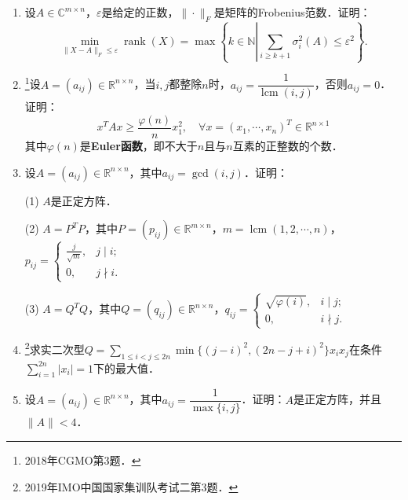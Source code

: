 \documentclass[a4paper,fontset=windows]{ctexbook}
\theoremstyle{definition}
\DeclareMathOperator{\diag}{diag}
\DeclareMathOperator{\lcm}{lcm}
\DeclareMathOperator{\rank}{rank}
\renewcommand{\le}{\leqslant}
\renewcommand{\ge}{\geqslant}
\begin{document}
\begin{enumerate}
\item 设$A\in\mathbb{C}^{m\times n}$，$\varepsilon$是给定的正数，$\|\cdot\|_F$是矩阵的Frobenius范数．证明：
$$\min_{\|X-A\|_F\le\varepsilon}\rank(X)=\max\left\{k\in\mathbb{N}\left|\sum_{i\ge k+1}\sigma_i^2(A)\le\varepsilon^2\right.\right\}.$$

\item \footnote{2018年CGMO第3题．}设$A=(a_{ij})\in\mathbb{R}^{n\times n}$，当$i,j$都整除$n$时，$a_{ij}=\dfrac{1}{\lcm(i,j)}$，否则$a_{ij}=0$．证明：
$$x^TAx\ge\frac{\varphi(n)}{n}x_1^2,\quad\forall x=(x_1,\cdots,x_n)^T\in\mathbb{R}^{n\times 1}$$
其中$\varphi(n)$是{\bf Euler函数}，即不大于$n$且与$n$互素的正整数的个数．

\item 设$A=(a_{ij})\in\mathbb{R}^{n\times n}$，其中$a_{ij}=\gcd(i,j)$．证明：

(1) $A$是正定方阵．

(2) $A=P^TP$，其中$P=(p_{ij})\in\mathbb{R}^{m\times n}$，$m=\lcm(1,2,\cdots,n)$，$p_{ij}=\begin{cases}\frac{j}{\sqrt{m}},&j\mid i; \\ 0,&j\nmid i.\end{cases}$

(3) $A=Q^TQ$，其中$Q=(q_{ij})\in\mathbb{R}^{n\times n}$，$q_{ij}=\begin{cases}\sqrt{\varphi(i)},&i\mid j; \\ 0,&i\nmid j.\end{cases}$

\item \footnote{2019年IMO中国国家集训队考试二第3题．}求实二次型$Q=\sum\limits_{1\le i<j\le 2n}\min\{(j-i)^2,(2n-j+i)^2\}x_ix_j$在条件$\sum\limits_{i=1}^{2n}|x_i|=1$下的最大值．

\item 设$A=(a_{ij})\in\mathbb{R}^{n\times n}$，其中$a_{ij}=\dfrac{1}{\max\{i,j\}}$．证明：$A$是正定方阵，并且$\|A\|<4$．


\end{enumerate}
\end{document}
